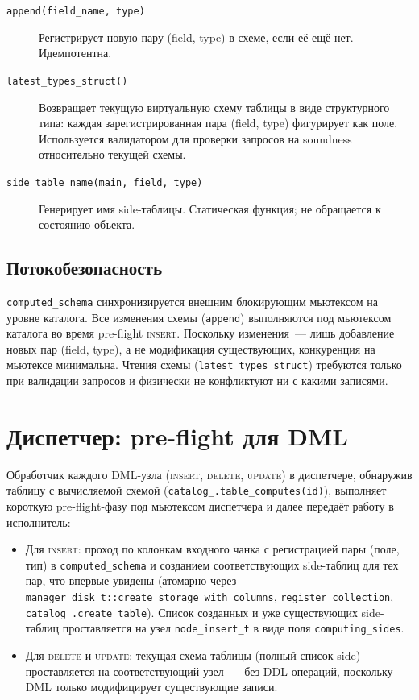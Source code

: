 \begin{description}
    \item[\texttt{append(field\_name, type)}] Регистрирует новую
    пару (field, type) в схеме, если её ещё нет. Идемпотентна.
    \item[\texttt{latest\_types\_struct()}] Возвращает текущую
    виртуальную схему таблицы в виде структурного типа: каждая
    зарегистрированная пара (field, type) фигурирует как поле.
    Используется валидатором для проверки запросов на
    soundness относительно текущей схемы.
    \item[\texttt{side\_table\_name(main, field, type)}]
    Генерирует имя side-таблицы. Статическая функция; не
    обращается к состоянию объекта.
\end{description}

\subsection{Потокобезопасность}

\texttt{computed\_schema} синхронизируется внешним блокирующим
мьютексом на уровне каталога. Все изменения схемы
(\texttt{append}) выполняются под мьютексом каталога во время
pre-flight \textsc{insert}. Поскольку изменения~--- лишь добавление
новых пар (field, type), а не модификация существующих, конкуренция
на мьютексе минимальна. Чтения схемы (\texttt{latest\_types\_struct})
требуются только при валидации запросов и физически не конфликтуют
ни с какими записями.

\section{Диспетчер: pre-flight для DML}

Обработчик каждого DML-узла (\textsc{insert}, \textsc{delete},
\textsc{update}) в диспетчере, обнаружив таблицу с вычисляемой
схемой (\texttt{catalog\_.table\_computes(id)}), выполняет короткую
pre-flight-фазу под мьютексом диспетчера и далее передаёт работу в
исполнитель:

\begin{itemize}
    \item Для \textsc{insert}: проход по колонкам входного чанка с
    регистрацией пары (поле, тип) в \texttt{computed\_schema} и
    созданием соответствующих side-таблиц для тех пар, что
    впервые увидены (атомарно через
    \texttt{manager\_disk\_t::create\_storage\_with\_columns},
    \texttt{register\_collection},
    \texttt{catalog\_.create\_table}). Список созданных и уже
    существующих side-таблиц проставляется на узел
    \texttt{node\_insert\_t} в виде поля
    \texttt{computing\_sides}.
    \item Для \textsc{delete} и \textsc{update}: текущая схема
    таблицы (полный список side) проставляется на соответствующий
    узел~--- без DDL-операций, поскольку DML только модифицирует
    существующие записи.
\end{itemize}

